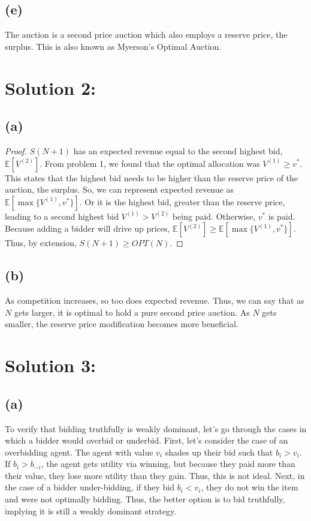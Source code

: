 \documentclass[10pt,a4paper]{article}
\begin{document}
  \subsection*{(e)}
    The auction is a second price auction which also employs a reserve 
    price, the surplus. This is also known as Myerson's Optimal Auction.
\section*{Solution 2:}
  \subsection*{(a)}
    \begin{proof}
      $S(N+1)$ has an expected revenue equal to the second highest bid, $\mathbb{E}[V^{(2)}]$. From problem 1, we found that the optimal allocation was 
      $V^{(1)}\geq v^*$. This states that the highest bid needs to be higher than the reserve price of the auction, the surplus. So, we can represent 
      expected revenue as $\mathbb{E}[\max\{V^{(1)},v^*\}]$. Or it is the highest bid, greater than the reserve price, leading to a second highest bid 
      $V^{(1)} > V^{(2)}$ being paid. Otherwise, $v^*$ is paid. Because adding a bidder will drive up prices, $\mathbb{E}[V^{(2)}] \geq
      \mathbb{E}[\max\{V^{(1)}, v^*\}]$. Thus, by extension, $S(N+1) \geq OPT(N)$. 
    \end{proof}
  \subsection*{(b)}
    As competition increases, so too does expected revenue. Thus, we can say that as $N$ gets larger, it is optimal to hold a pure second price auction. As $N$ gets smaller, the reserve price modification becomes more beneficial. 

\section*{Solution 3:}
  \subsection*{(a)}
    To verify that bidding truthfully is weakly dominant, let's go through the cases in which a bidder would overbid or underbid. First, let's consider the case 
    of an overbidding agent. The agent with value $v_i$ shades up their bid such that $b_i>v_i$. If $b_i>b_{-i}$, the agent gets utility via winning, but 
    because they paid more than their value, they lose more utility than they gain. Thus, this is not ideal. Next, in the case of a bidder under-bidding, if 
    they bid $b_i<v_i$, they do not win the item and were not optimally bidding. Thus, the better option is to bid truthfully, implying it is still a weakly 
    dominant strategy.
\end{document}
